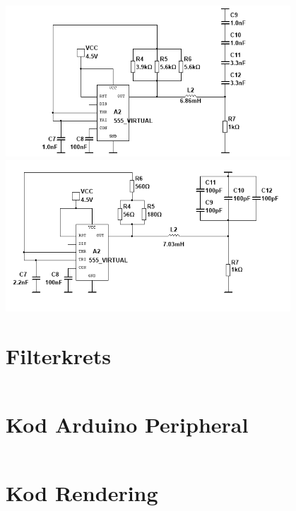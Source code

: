 \documentclass[a4paper]{article}
\begin{document}
\begin{sloppypar}
    \label{bilaga:Schema-Oscillatorkretsar}
    \includegraphics[width = 0.8\textwidth]{555-100kHz-circuit.png}
    \includegraphics[width = 0.8\textwidth]{555-117kHz-circuit.png}




    \section{Filterkrets}

    \inputminted[breaklines]{cpp}{./Code/Spolsnurrare.cpp}

    \section{Kod Arduino Peripheral}
    \label{bilaga:Kod_Arduino_Peripheral}
    \inputminted[breaklines]{cpp}{./Code/peripheral.cpp}

    \section{Kod Rendering}
    \label{bilaga:Kod_Rendering}
    \inputminted[breaklines]{csharp}{./Code/handController.cs}
    \newpage
\end{sloppypar}
\end{document}
